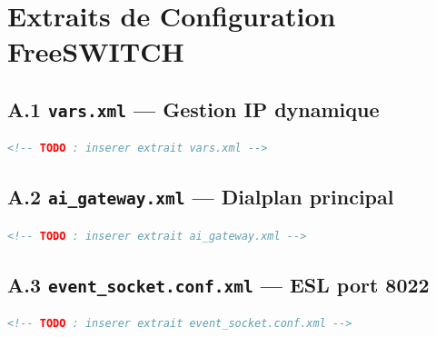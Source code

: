 \chapter{Extraits de Configuration FreeSWITCH}

\section*{A.1 \texttt{vars.xml} — Gestion IP dynamique}

\begin{lstlisting}[language=XML, caption={vars.xml -- Configuration FreeSWITCH}]
<!-- TODO : inserer extrait vars.xml -->
\end{lstlisting}

\section*{A.2 \texttt{ai\_gateway.xml} — Dialplan principal}

\begin{lstlisting}[language=XML, caption={ai\_gateway.xml -- Dialplan principal}]
<!-- TODO : inserer extrait ai_gateway.xml -->
\end{lstlisting}

\section*{A.3 \texttt{event\_socket.conf.xml} — ESL port 8022}

\begin{lstlisting}[language=XML, caption={event\_socket.conf.xml -- Port ESL 8022}]
<!-- TODO : inserer extrait event_socket.conf.xml -->
\end{lstlisting}
